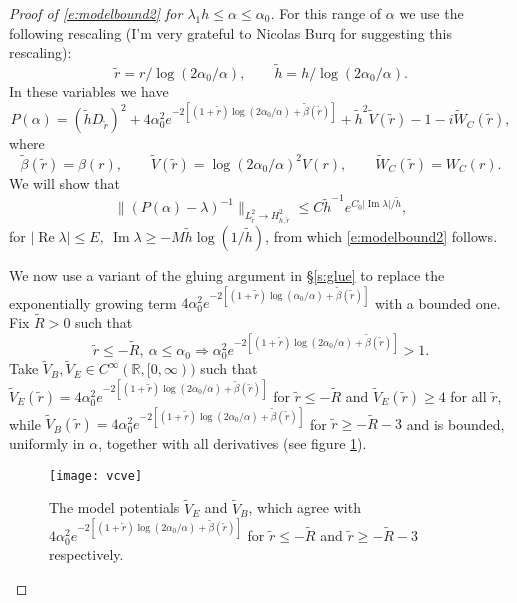 \documentclass[reqno, 12pt]{amsart}
\newcommand \R {\mathbb{R}}
\DeclareMathOperator \re {Re}
\DeclareMathOperator \im {Im}
\theoremstyle{definition}
\numberwithin{equation}{section}
\numberwithin{prop}{section}
\numberwithin{figure}{section}
\begin{document}
\begin{proof}[Proof of \eqref{e:modelbound2} for $\lambda_1 h \le \alpha \le \alpha_0$]
For this range of $\alpha$ we use the following rescaling (I'm very grateful to Nicolas Burq for suggesting this rescaling):
\begin{equation}\label{e:tildevars}
\tilde r = r/ \log(2\alpha_0/\alpha), \qquad \tilde h = h/\log(2\alpha_0/\alpha).
\end{equation}
In these variables we have
\[
P(\alpha) =  (\tilde hD_{\tilde r})^2 + 4\alpha_0^2 e^{-2\left[(1+\tilde r)\log(2\alpha_0/\alpha) + \tilde \beta(\tilde r)\right]}+ \tilde h^2 \widetilde V(\tilde r) - 1 - i\widetilde W_C(\tilde r),
\]
where
\[
\tilde \beta(\tilde r) = \beta(r), \qquad \widetilde V(\tilde r) = \log(2\alpha_0/\alpha)^2 V(r), \qquad \widetilde W_C(\tilde r) =W_C(r).
\]
We will show that
\begin{equation}\label{e:modelbound2tilde0}
\|(P(\alpha) - \lambda)^{-1}\|_{L^2_{\tilde r} \to H^2_{h,\tilde r}} \le C \tilde h^{-1}e^{C_0 |\im \lambda| /\tilde h},
\end{equation}
for $|\re \lambda| \le E, \ \im \lambda \ge - M \tilde h \log (1/\tilde h)$, from which \eqref{e:modelbound2} follows.

We now use a variant of the gluing argument in \S\ref{s:glue} to replace the exponentially growing term $4\alpha_0^2 e^{-2\left[(1+\tilde r)\log(\alpha_0/\alpha) + \tilde \beta(\tilde r)\right]}$ with a bounded one.  Fix $\widetilde R >0$ such that  
\[
\tilde r \le- \widetilde R,\ \alpha \le \alpha_0 \Longrightarrow \alpha_0^2 e^{-2\left[(1+\tilde r)\log(2\alpha_0/\alpha) + \tilde \beta(\tilde r)\right]} > 1.
\]
Take $\widetilde V_B, \widetilde V_E \in C^\infty(\R, [0,\infty))$ such that $\widetilde V_E(\tilde r) = 4\alpha_0^2 e^{-2\left[(1+\tilde r)\log(2\alpha_0/\alpha) + \tilde \beta(\tilde r)\right]} $ for $\tilde r \le -  \widetilde R$ and $\widetilde V_E(\tilde r) \ge 4$ for all $\tilde r$, while $\widetilde V_B(\tilde r) = 4\alpha_0^2 e^{-2\left[(1+\tilde r)\log(2\alpha_0/\alpha) + \tilde \beta(\tilde r)\right]} $ for $\tilde r \ge- \widetilde R-3$ and is bounded, uniformly in $\alpha$, together with all derivatives (see figure \ref{f:vcve}).

\begin{figure}[htbp]
\texttt{[image: vcve]}
\caption{The model potentials $\widetilde V_E$ and $\widetilde V_B$, which agree with $4\alpha_0^2 e^{-2\left[(1+\tilde r)\log(2\alpha_0/\alpha) + \tilde \beta(\tilde r)\right]}$ for $\tilde r \le- \widetilde R$  and  $\tilde r \ge - \widetilde R-3$ respectively.}\label{f:vcve}
\end{figure}


\end{proof}
\end{document}
